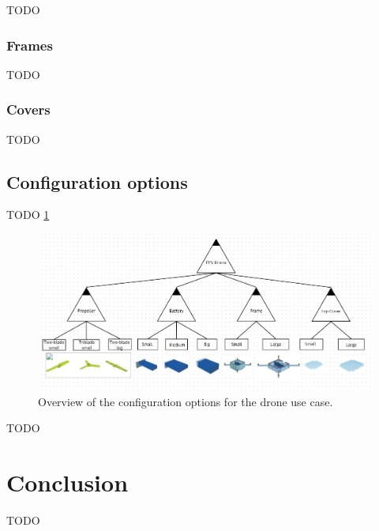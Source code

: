 \documentclass[sigconf,review]{acmart}
\begin{document}
TODO

\subsubsection{Frames}
\label{sec:frames}

TODO

\subsubsection{Covers}
\label{sec:covers}

TODO

\subsection{Configuration options}
\label{sec:configuration-options}

TODO \cref{fig:feature-tree}

\begin{figure}[htbp]
    \includegraphics[width=\textwidth]{./drone-case-feature-tree.jpg}
    \caption{Overview of the configuration options for the drone use case.}
    \label{fig:feature-tree}
\end{figure}

TODO

\section{Conclusion}
\label{sec:conclusion}

TODO



\end{document}
